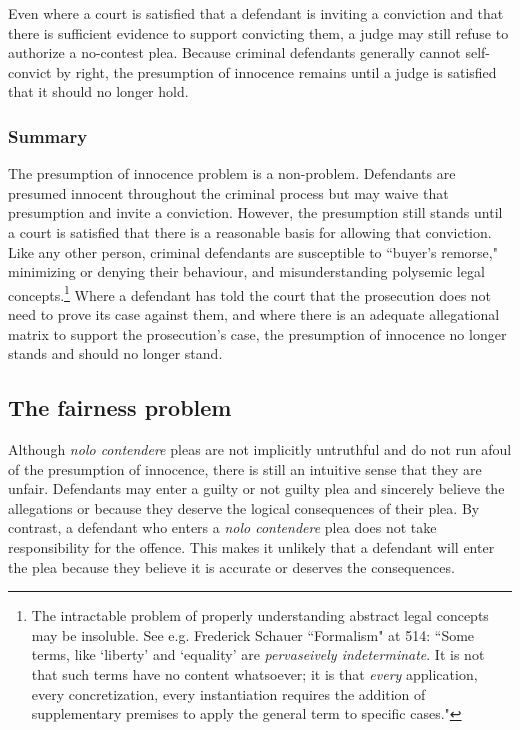 Even where a court is satisfied that a defendant is inviting a conviction and that there is sufficient evidence to support convicting them, a judge may still refuse to authorize a no-contest plea. Because criminal defendants generally cannot self-convict by right, the presumption of innocence remains until a judge is satisfied that it should no longer hold.

\subsubsection{Summary}

The presumption of innocence problem is a non-problem. Defendants are presumed innocent throughout the criminal process but may waive that presumption and invite a conviction. However, the presumption still stands until a court is satisfied that there is a reasonable basis for allowing that conviction. Like any other person, criminal defendants are susceptible to ``buyer's remorse," minimizing or denying their behaviour, and  misunderstanding polysemic legal concepts.\footnote{The intractable problem of properly understanding abstract legal concepts may be insoluble. See e.g. Frederick Schauer ``Formalism" at 514: ``Some terms, like `liberty' and `equality' are \textit{pervaseively indeterminate}. It is not that such terms have no content whatsoever; it is that \textit{every} application, every concretization, every instantiation requires the addition of supplementary premises to apply the general term to specific cases."} Where a defendant has told the court that the prosecution does not need to prove its case against them, and where there is an adequate allegational matrix to support the prosecution's case, the presumption of innocence no longer stands and should no longer stand.

\subsection{The fairness problem}

Although \textit{nolo contendere} pleas are not implicitly untruthful and do not run afoul of the presumption of innocence, there is still an intuitive sense that they are unfair. Defendants may enter a guilty or not guilty plea and sincerely believe the allegations or because they deserve the logical consequences of their plea. By contrast, a defendant who enters a \textit{nolo contendere} plea does not take responsibility for the offence. This makes it unlikely that a defendant will enter the plea because they believe it is accurate or deserves the consequences.


